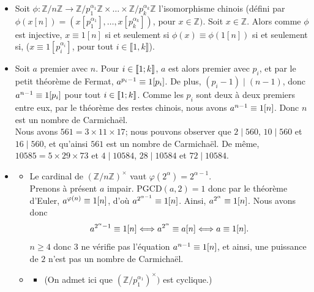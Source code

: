 \documentclass[11pt,a4paper]{article}
\newcommand{\Z}{\mathbb{Z}}
\begin{document}
\begin{itemize}
\item[$1.a)$]  Soit $\phi:\Z/n\Z\rightarrow \Z/p_1^{\alpha_1}\Z\times \ldots \times \Z/p_k^{\alpha_k}\Z$ l'isomorphisme chinois (défini par $\phi(x[n])=(x[p_1^{\alpha_1}],\ldots, x[p_k^{\alpha_k}])$, pour $x\in \Z)$. Soit $x\in \Z$. Alors comme $\phi$ est injective,  $x\equiv 1[n]$ si et seulement si $\phi(x)\equiv \phi(1[n])$ si et seulement si, ($x\equiv 1[p_i^{\alpha_i}]$, pour tout $i\in \llbracket 1,k\rrbracket$).  \\
\item[$1b.)$] Soit $a$ premier avec $n$. Pour $i\in \llbracket 1;k \rrbracket$, $a$ est alors premier avec $p_i$, et par le petit théorème de Fermat, $ a^{p_i-1} \equiv 1 [{p_i}] $. De plus, $(p_i-1) \mid (n-1)$, donc $a^{n-1} \equiv 1 [{p_i}]$ pour tout $i \in \llbracket 1;k \rrbracket$. Comme les $p_i$ sont deux à deux premiers entre eux, par le théorème des restes chinois,
nous avons $a^{n-1} \equiv 1 [{n}]$. Donc $n$ est un nombre de Carmichaël. \\
Nous avons $561= 3\times 11 \times 17$; nous pouvons observer que $2 \mid 560$, $10 \mid 560$ et $16 \mid 560$, et qu'ainsi $561$ est un nombre de Carmichaël. De même, $10585= 5 \times 29 \times 73$ et $4 \mid 10584$, $28 \mid 10584$ et $72 \mid 10584$.\\
\item[$2.$] 
\begin{itemize}
\item[$a)$] Le cardinal de $(\mathbb{Z}/n\mathbb{Z})^{\times}$ vaut $\varphi(2^{\alpha})=2^{\alpha-1}$.\\
Prenons à présent $a$ impair. PGCD$(a,2)=1$ donc par le théorème d'Euler, $a^{\varphi(n)} \equiv 1 [{n}]$, d'où $a^{2^{\alpha-1}} \equiv 1 [{n}]$. Ainsi, $a^{2^{\alpha}} \equiv 1 [{n}]$. Nous avons donc 
$$ a^{2^{\alpha}-1} \equiv 1 [{n}] \Longleftrightarrow a^{2^{\alpha}} \equiv a [{n}] \Longleftrightarrow a \equiv 1 [{n}].  $$
$n \geqslant 4$ donc $3$ ne vérifie pas l'équation $a^{n-1} \equiv 1 [{n}]$, et ainsi, une puissance de $2$ n'est pas un nombre de Carmichaël.
\\
\item[$b)$] 
\begin{itemize}
\item[$(i)$] (On admet ici que $(\mathbb{Z}/p_1^{\alpha_1})^{\times})$ est cyclique.)


\end{itemize}
\end{itemize}
\end{itemize}
\end{document}
